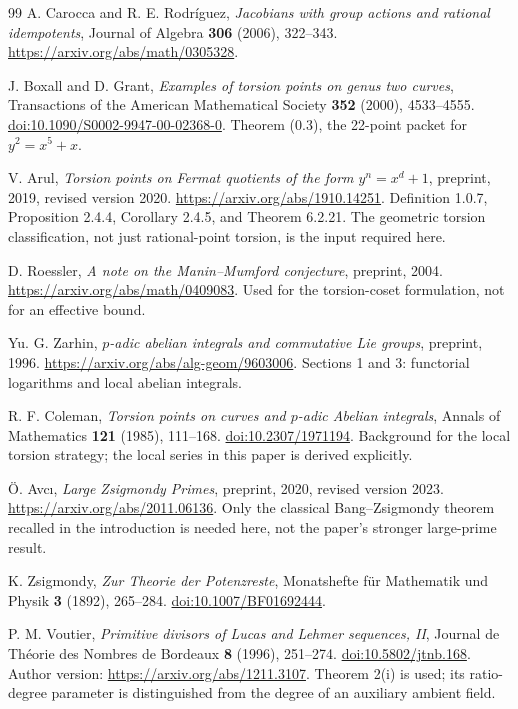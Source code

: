 \documentclass[11pt,a4paper]{article}
\numberwithin{equation}{section}
\theoremstyle{definition}
\theoremstyle{remark}
\begin{document}
\begin{thebibliography}{99}
A. Carocca and R. E. Rodr\'iguez, \emph{Jacobians with group actions and
rational idempotents}, Journal of Algebra \textbf{306} (2006), 322--343.
\url{https://arxiv.org/abs/math/0305328}.

J. Boxall and D. Grant, \emph{Examples of torsion points on genus two
curves}, Transactions of the American Mathematical Society
\textbf{352} (2000), 4533--4555.
\href{https://doi.org/10.1090/S0002-9947-00-02368-0}{doi:10.1090/S0002-9947-00-02368-0}.
Theorem (0.3), the 22-point packet for $y^2=x^5+x$.

V. Arul, \emph{Torsion points on Fermat quotients of the form
$y^n=x^d+1$}, preprint, 2019, revised version 2020.
\url{https://arxiv.org/abs/1910.14251}.
Definition 1.0.7, Proposition 2.4.4, Corollary 2.4.5, and Theorem 6.2.21.
The geometric torsion classification, not just rational-point torsion,
is the input required here.

D. Roessler, \emph{A note on the Manin--Mumford conjecture}, preprint,
2004. \url{https://arxiv.org/abs/math/0409083}.
Used for the torsion-coset formulation, not for an effective bound.

Yu. G. Zarhin, \emph{$p$-adic abelian integrals and commutative Lie groups},
preprint, 1996. \url{https://arxiv.org/abs/alg-geom/9603006}.
Sections 1 and 3: functorial logarithms and local abelian integrals.

R. F. Coleman, \emph{Torsion points on curves and $p$-adic Abelian integrals},
Annals of Mathematics \textbf{121} (1985), 111--168.
\href{https://doi.org/10.2307/1971194}{doi:10.2307/1971194}.
Background for the local torsion strategy; the local series in this paper
is derived explicitly.

\"O. Avc\i, \emph{Large Zsigmondy Primes}, preprint, 2020, revised
version 2023. \url{https://arxiv.org/abs/2011.06136}.
Only the classical Bang--Zsigmondy theorem recalled in the introduction
is needed here, not the paper's stronger large-prime result.

K. Zsigmondy, \emph{Zur Theorie der Potenzreste}, Monatshefte f\"ur
Mathematik und Physik \textbf{3} (1892), 265--284.
\href{https://doi.org/10.1007/BF01692444}{doi:10.1007/BF01692444}.

P. M. Voutier, \emph{Primitive divisors of Lucas and Lehmer sequences, II},
Journal de Th\'eorie des Nombres de Bordeaux \textbf{8} (1996), 251--274.
\href{https://doi.org/10.5802/jtnb.168}{doi:10.5802/jtnb.168}.
Author version: \url{https://arxiv.org/abs/1211.3107}.
Theorem 2(i) is used; its ratio-degree parameter is distinguished from
the degree of an auxiliary ambient field.


\end{thebibliography}
\end{document}
